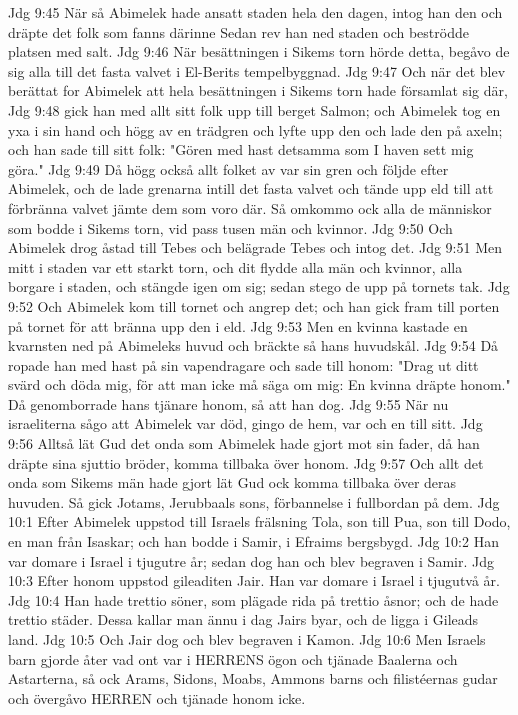Jdg 9:45  När så Abimelek hade ansatt staden hela den dagen, intog han den och dräpte det folk som fanns därinne Sedan rev han ned staden och beströdde platsen med salt.
Jdg 9:46  När besättningen i Sikems torn hörde detta, begåvo de sig alla till det fasta valvet i El-Berits tempelbyggnad.
Jdg 9:47  Och när det blev berättat for Abimelek att hela besättningen i Sikems torn hade församlat sig där,
Jdg 9:48  gick han med allt sitt folk upp till berget Salmon; och Abimelek tog en yxa i sin hand och högg av en trädgren och lyfte upp den och lade den på axeln; och han sade till sitt folk: "Gören med hast detsamma som I haven sett mig göra."
Jdg 9:49  Då högg också allt folket av var sin gren och följde efter Abimelek, och de lade grenarna intill det fasta valvet och tände upp eld till att förbränna valvet jämte dem som voro där. Så omkommo ock alla de människor som bodde i Sikems torn, vid pass tusen män och kvinnor.
Jdg 9:50  Och Abimelek drog åstad till Tebes och belägrade Tebes och intog det.
Jdg 9:51  Men mitt i staden var ett starkt torn, och dit flydde alla män och kvinnor, alla borgare i staden, och stängde igen om sig; sedan stego de upp på tornets tak.
Jdg 9:52  Och Abimelek kom till tornet och angrep det; och han gick fram till porten på tornet för att bränna upp den i eld.
Jdg 9:53  Men en kvinna kastade en kvarnsten ned på Abimeleks huvud och bräckte så hans huvudskål.
Jdg 9:54  Då ropade han med hast på sin vapendragare och sade till honom: "Drag ut ditt svärd och döda mig, för att man icke må säga om mig: En kvinna dräpte honom." Då genomborrade hans tjänare honom, så att han dog.
Jdg 9:55  När nu israeliterna sågo att Abimelek var död, gingo de hem, var och en till sitt.
Jdg 9:56  Alltså lät Gud det onda som Abimelek hade gjort mot sin fader, då han dräpte sina sjuttio bröder, komma tillbaka över honom.
Jdg 9:57  Och allt det onda som Sikems män hade gjort lät Gud ock komma tillbaka över deras huvuden. Så gick Jotams, Jerubbaals sons, förbannelse i fullbordan på dem.
Jdg 10:1  Efter Abimelek uppstod till Israels frälsning Tola, son till Pua, son till Dodo, en man från Isaskar; och han bodde i Samir, i Efraims bergsbygd.
Jdg 10:2  Han var domare i Israel i tjugutre år; sedan dog han och blev begraven i Samir.
Jdg 10:3  Efter honom uppstod gileaditen Jair. Han var domare i Israel i tjugutvå år.
Jdg 10:4  Han hade trettio söner, som plägade rida på trettio åsnor; och de hade trettio städer. Dessa kallar man ännu i dag Jairs byar, och de ligga i Gileads land.
Jdg 10:5  Och Jair dog och blev begraven i Kamon.
Jdg 10:6  Men Israels barn gjorde åter vad ont var i HERRENS ögon och tjänade Baalerna och Astarterna, så ock Arams, Sidons, Moabs, Ammons barns och filistéernas gudar och övergåvo HERREN och tjänade honom icke.

